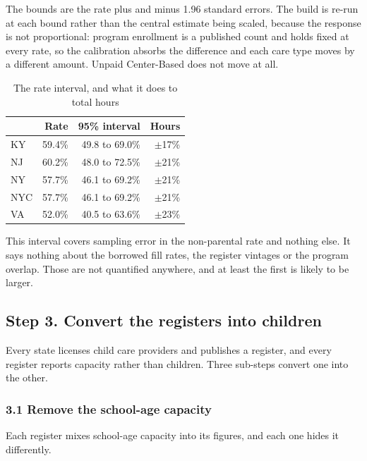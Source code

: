 \documentclass[11pt]{article}
\begin{document}
The bounds are the rate plus and minus 1.96 standard errors. The build is re-run
at each bound rather than the central estimate being scaled, because the
response is not proportional: program enrollment is a published count and holds
fixed at every rate, so the calibration absorbs the difference and each care
type moves by a different amount. Unpaid Center-Based does not move at all.

\begin{table}[H]
\centering
\caption{The rate interval, and what it does to total hours}
\begin{tabular}{L{1.6cm}rrr}
\toprule
& \textbf{Rate} & \textbf{95\% interval} & \textbf{Hours} \\
\midrule
KY  & 59.4\% & 49.8 to 69.0\% & $\pm$17\% \\
NJ  & 60.2\% & 48.0 to 72.5\% & $\pm$21\% \\
NY  & 57.7\% & 46.1 to 69.2\% & $\pm$21\% \\
NYC & 57.7\% & 46.1 to 69.2\% & $\pm$21\% \\
VA  & 52.0\% & 40.5 to 63.6\% & $\pm$23\% \\
\bottomrule
\end{tabular}
\end{table}

This interval covers sampling error in the non-parental rate and nothing else.
It says nothing about the borrowed fill rates, the register vintages or the
program overlap. Those are not quantified anywhere, and at least the first is
likely to be larger.

\subsection*{Step 3. Convert the registers into children}

Every state licenses child care providers and publishes a register, and every
register reports capacity rather than children. Three sub-steps convert one into
the other.

\subsubsection*{3.1 Remove the school-age capacity}

Each register mixes school-age capacity into its figures, and each one hides it
differently.
\end{document}

